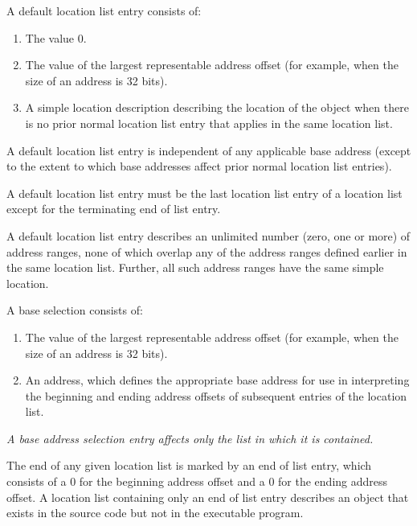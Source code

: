 A default location list entry consists of:
\begin{enumerate}[1. ]
\item The value 0.
\item The value of the largest representable address offset (for
      example, \wffffffff when the size of an address is 32 bits).
\item A simple location description describing the location of the
      object when there is no prior normal location list entry
      that applies in the same location list.
\end{enumerate}

A default location list entry is independent of any applicable
base address (except to the extent to which base addresses
affect prior normal location list entries).

A default location list entry must be the last location list
entry of a location list except for the terminating end of list
entry.

A default location list entry describes an unlimited number
(zero, one or more) of address ranges, none of which overlap
any of the address ranges defined earlier in the same location
list. Further, all such address ranges have the same simple
location.

A base 
selection 
consists of:
\begin{enumerate}[1. ]
\item The value of the largest representable 
address offset (for example, \wffffffff when the size of
an address is 32 bits).
\item An address, which defines the 
appropriate base address for use in interpreting the beginning
and ending address offsets of subsequent entries of the location list.
\end{enumerate}

\textit{A base address selection entry 
affects only the list in which it is contained.}

The end of any given location list is marked by an 
end of list entry, which consists of a 0 for the beginning address
offset and a 0 for the ending address offset. A location list
containing only an 
end of list entry describes an object that
exists in the source code but not in the executable program.

